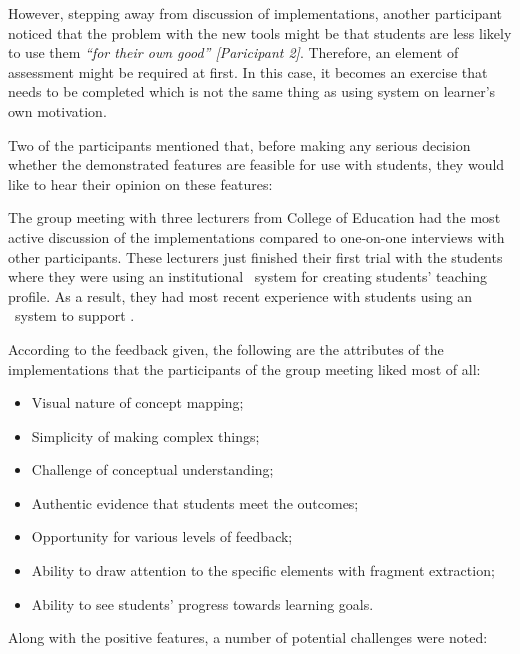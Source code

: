 However, stepping away from discussion of implementations, another participant
noticed that the problem with the new tools might be that students are less
likely to use them \textit{``for their own good'' [Paricipant 2]}. Therefore, an
element of assessment might be required at first. In this case, it becomes an
exercise that needs to be completed which is not the same thing as using system
on learner's own motivation.

Two of the participants mentioned that, before making any serious decision
whether the demonstrated features are feasible for use with students, they would
like to hear their opinion on these features:


The group meeting with three lecturers from College of Education had the most
active discussion of the implementations compared to one-on-one interviews
with other participants. These lecturers just finished their first trial with
the students where they were using an institutional \ep~system for creating
students' teaching profile. As a result, they had most recent experience with
students using an \ep~system to support \LLLsn.

According to the feedback given, the following are the attributes of the
implementations that the participants of the group meeting liked most of all:

\begin{itemize}
  \item Visual nature of concept mapping;
  \item Simplicity of making complex things;
  \item Challenge of conceptual understanding;
  \item Authentic evidence that students meet the outcomes;
  \item Opportunity for various levels of feedback;
  \item Ability to draw attention to the specific elements with fragment
  extraction;
  \item Ability to see students' progress towards learning goals.
\end{itemize}

Along with the positive features, a number of potential challenges were noted:

